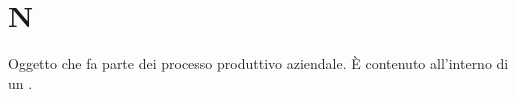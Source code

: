 \section{N}
Oggetto che fa parte dei processo produttivo aziendale. È contenuto all'interno di un .
